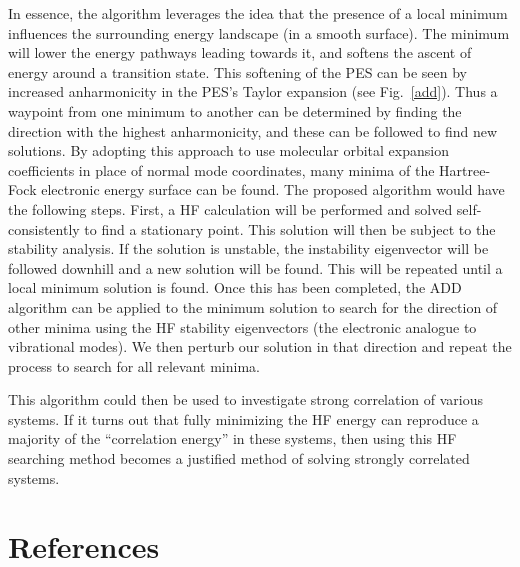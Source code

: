 \documentclass{revtex4}
\begin{document}
    In essence, the algorithm leverages the idea that the 
    presence of a local minimum influences the surrounding energy landscape (in a smooth surface). 
    The minimum will lower the energy pathways leading towards it, and softens the ascent of energy 
    around a transition state. This softening of the PES can be seen by increased anharmonicity in 
    the PES's Taylor expansion (see Fig.~\ref{add}). Thus a waypoint from one minimum to another 
    can 
    be determined by 
    finding the direction with the highest anharmonicity, and these can be followed to find new 
    solutions. By adopting this approach to use 
    molecular orbital expansion 
    coefficients in place of normal mode coordinates, many minima of the Hartree-Fock electronic 
    energy surface can be found. The proposed algorithm would have the following steps. First, a HF 
    calculation will be performed and solved self-consistently to find a stationary point. This 
    solution will then be subject to the stability analysis. If the solution is unstable, the 
    instability eigenvector will be followed downhill and a new solution will be found. This will 
    be repeated until a local minimum solution is found. Once this has been completed, the ADD 
    algorithm can be applied to the minimum solution to search for the direction of other minima 
    using the HF stability eigenvectors (the electronic analogue to vibrational modes). We then 
    perturb our solution in that direction and repeat the process to search for all relevant 
    minima. 
    
    This algorithm could then be used to investigate strong correlation of various systems. If it 
    turns out that fully minimizing the HF energy can reproduce a majority of the ``correlation 
    energy'' in these systems, then using this HF searching method becomes a justified method of 
    solving strongly correlated systems. 
    

    
    
    
    
      

\section{References}

\end{document}
